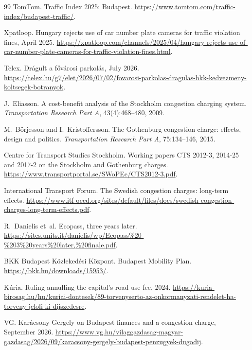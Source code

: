 \documentclass[11pt,a4paper]{article}
\begin{document}
\begin{thebibliography}{99}
TomTom.
\newblock Traffic Index 2025: Budapest.
\newblock \url{https://www.tomtom.com/traffic-index/budapest-traffic/}.

Xpatloop.
\newblock Hungary rejects use of car number plate cameras for traffic violation fines, April 2025.
\newblock \url{https://xpatloop.com/channels/2025/04/hungary-rejects-use-of-car-number-plate-cameras-for-traffic-violation-fines.html}.

Telex.
\newblock Drágult a fővárosi parkolás, July 2026.
\newblock \url{https://telex.hu/g7/elet/2026/07/02/fovarosi-parkolas-dragulas-bkk-kedvezmeny-koltsegek-botranyok}.

J.~Eliasson.
\newblock A cost-benefit analysis of the {S}tockholm congestion charging system.
\newblock \emph{Transportation Research Part A}, 43(4):468--480, 2009.

M.~B{\"o}rjesson and I.~Kristoffersson.
\newblock The {G}othenburg congestion charge: effects, design and politics.
\newblock \emph{Transportation Research Part A}, 75:134--146, 2015.

Centre for Transport Studies Stockholm.
\newblock Working papers CTS 2012-3, 2014-25 and 2017-2 on the Stockholm and Gothenburg charges.
\newblock \url{https://www.transportportal.se/SWoPEc/CTS2012-3.pdf}.

International Transport Forum.
\newblock The {S}wedish congestion charges: long-term effects.
\newblock \url{https://www.itf-oecd.org/sites/default/files/docs/swedish-congestion-charges-long-term-effects.pdf}.

R.~Danielis et~al.
\newblock Ecopass, three years later.
\newblock \url{https://sites.units.it/danielis/wp/Ecopass\%20-\%203\%20years\%20later,\%20finale.pdf}.

BKK Budapest Közlekedési Központ.
\newblock Budapest Mobility Plan.
\newblock \url{https://bkk.hu/downloads/15953/}.

K{\'u}ria.
\newblock Ruling annulling the capital's road-use fee, 2024.
\newblock \url{https://kuria-birosag.hu/hu/kuriai-dontesek/89-torvenyserto-az-onkormanyzati-rendelet-ha-torveny-jeloli-ki-dijszedesre}.

VG.
\newblock Karácsony Gergely on Budapest finances and a congestion charge, September 2026.
\newblock \url{https://www.vg.hu/vilaggazdasag-magyar-gazdasag/2026/09/karacsony-gergely-budapest-penzugyek-dugodij}.


\end{thebibliography}
\end{document}
